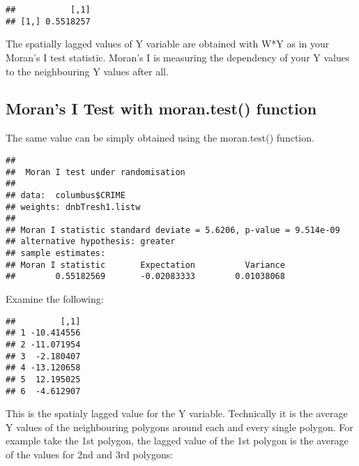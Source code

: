 \documentclass[
]{book}
\newenvironment{Shaded}{\begin{snugshade}}{\end{snugshade}}
\newcommand{\KeywordTok}[1]{\textcolor[rgb]{0.13,0.29,0.53}{\textbf{#1}}}
\newcommand{\NormalTok}[1]{#1}
\newcommand{\OperatorTok}[1]{\textcolor[rgb]{0.81,0.36,0.00}{\textbf{#1}}}
\newcommand{\StringTok}[1]{\textcolor[rgb]{0.31,0.60,0.02}{#1}}
\begin{document}
\begin{verbatim}
##           [,1]
## [1,] 0.5518257
\end{verbatim}

The spatially lagged values of Y variable are obtained with W*Y as in your Moran's I test statistic. Moran's I is measuring the dependency of your Y values to the neighbouring Y values after all.

\hypertarget{morans-i-test-with-moran.test-function}{%
\subsection{Moran's I Test with moran.test() function}\label{morans-i-test-with-moran.test-function}}

The same value can be simply obtained using the moran.test() function.

\begin{Shaded}
\end{Shaded}

\begin{verbatim}
## 
## 	Moran I test under randomisation
## 
## data:  columbus$CRIME  
## weights: dnbTresh1.listw    
## 
## Moran I statistic standard deviate = 5.6206, p-value = 9.514e-09
## alternative hypothesis: greater
## sample estimates:
## Moran I statistic       Expectation          Variance 
##        0.55182569       -0.02083333        0.01038068
\end{verbatim}

Examine the following:

\begin{Shaded}
\end{Shaded}

\begin{verbatim}
##         [,1]
## 1 -10.414556
## 2 -11.071954
## 3  -2.180407
## 4 -13.120658
## 5  12.195025
## 6  -4.612907
\end{verbatim}

This is the spatialy lagged value for the Y variable. Technically it is the average Y values of the neighbouring polygons around each and every single polygon. For example take the 1st polygon, the lagged value of the 1st polygon is the average of the values for 2nd and 3rd polygons:
\end{document}
